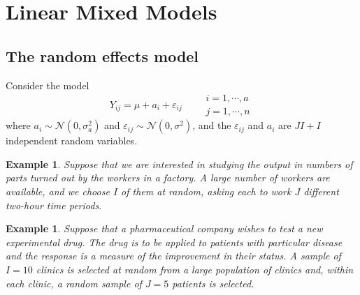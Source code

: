 \documentclass{article}
\newtheorem{example}[theorem]{Example}
\begin{document}
\section{Linear Mixed Models}

\subsection{The random effects model}

Consider the model%
\begin{equation*}
Y_{ij}=\mu +a_{i}+\varepsilon _{ij}\qquad 
\begin{array}{c}
i=1,\cdots ,a \\ 
j=1,\cdots ,n%
\end{array}%
\end{equation*}%
where $a_{i}\sim \mathcal{N}\left( 0,\sigma _{a}^{2}\right) $ and $%
\varepsilon _{ij}\sim \mathcal{N}\left( 0,\sigma ^{2}\right) $, and the $%
\varepsilon _{ij}$ and $a_{i}$ are $JI+I$ independent random variables.

\bigskip

\begin{example}
Suppose that we are interested in studying the output in numbers of parts
turned out by the workers in a factory. A large number of workers are
available, and we choose $I$ of them at random, asking each to work $J$
different two-hour time periods.
\end{example}

\begin{example}
Suppose that a pharmaceutical company wishes to test a new experimental
drug. The drug is to be applied to patients with particular disease and the
response is a measure of the improvement in their status. A sample of $I=10$
clinics is selected at random from a large population of clinics and, within
each clinic, a random sample of $J=5$ patients is selected.
\end{example}

\bigskip
\end{document}
